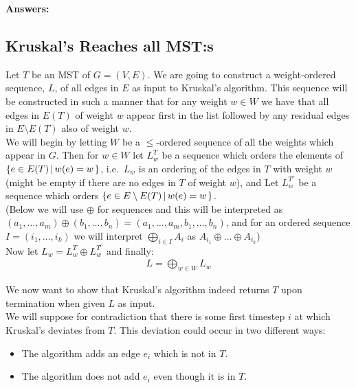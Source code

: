 \documentclass[nobib]{tufte-handout}
\newcommand{\bigset}[3][1]{%
    \ifthenelse{1=#1}{%
        \left\{#2 \left| \, #3 \right.\right\}
    }{%
        \left\{#2\right\}
    }
}
\begin{document}
\textbf{Answers:} \\ 
 \subsection{Kruskal's Reaches all MST:s}
            Let $T$ be an MST of $G = (V, E)$. We are going to construct a weight-ordered sequence, $L$, of all edges in $E$ as input to Kruskal's algorithm. This sequence will be constructed in such a manner that for any weight $w \in W$ we have that all edges in $E(T)$ of weight $w$ appear first in the list followed by any residual edges in $E \setminus E(T)$ also of weight $w$. \\
            
            We will begin by letting $W$ be a $\leq$-ordered sequence of all the weights which appear in $G$. Then for $w \in W$ let $L_w^T$ be a sequence which orders the elements of $\bigset[1]{e \in E(T)}{w(e) = w}$, i.e.\ $L_w$ is an ordering of the edges in $T$ with weight $w$ (might be empty if there are no edges in $T$ of weight $w$), and Let $L_w^{T^c}$ be a sequence which orders $\bigset[1]{e \in E \setminus E(T)}{w(e) = w}$. \\
            
            (Below we will use $\oplus$ for sequences and this will be interpreted as $(a_1, \ldots, a_m) \oplus (b_1, \ldots, b_n) = (a_1, \ldots, a_m, b_1, \ldots, b_n)$, and for an ordered sequence $I = (i_1, \ldots, i_k)$ we will interpret $\bigoplus\limits_{i \in I} A_i$ as $A_{i_1} \oplus \ldots \oplus A_{i_k}$) \\
            
            Now let $L_w = L_w^T \oplus L_w^{T^c}$ and finally:
%
            \begin{align*}
                L = \bigoplus_{w \in W} L_w
            \end{align*}

            We now want to show that Kruskal's algorithm indeed returns $T$ upon termination when given $L$ as input. \\

            We will suppose for contradiction that there is some first timestep $i$ at which Kruskal's deviates from $T$. This deviation could occur in two different ways:
            
            \begin{itemize}
                \item The algorithm adds an edge $e_i$ which is not in $T$.
                \item The algorithm does not add $e_i$ even though it is in $T$.
            \end{itemize}
            
\end{document}
